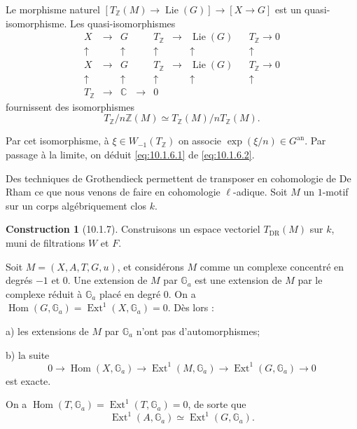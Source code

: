 \documentclass[12pt,a4paper]{amsart}
\theoremstyle{plain}
\theoremstyle{definition}
\newtheorem{construction}[lemme]{Construction}
\theoremstyle{remark}
\DeclareMathOperator{\Hom}{Hom}
\DeclareMathOperator{\Ext}{Ext}
\DeclareMathOperator{\Lie}{Lie}
\numberwithin{equation}{section}
\begin{document}
Le morphisme naturel $[T_\mathbb{Z}(M)\to\Lie(G)]\to[X\to G]$ est un quasi-isomorphisme. Les quasi-isomorphismes
\[
\begin{array}{ccccccccc}
X & \longrightarrow & G & & T_\mathbb{Z} & \longrightarrow & \Lie(G) & & T_\mathbb{Z} \longrightarrow 0 \\
\uparrow & & \uparrow & & \uparrow & & \uparrow & & \uparrow \\
X & \longrightarrow & G & & T_\mathbb{Z} & \longrightarrow & \Lie(G) & & T_\mathbb{Z} \longrightarrow 0 \\
\uparrow & & \uparrow & & \uparrow & & \uparrow & & \uparrow \\
T_\mathbb{Z} & \longrightarrow & \mathbb{C} & \longrightarrow & 0 & & & &
\end{array}
\]
fournissent des isomorphismes
\begin{equation}\label{eq:10.1.6.2}
T_\mathbb{Z}/n\mathbb{Z}(M) \simeq T_\mathbb{Z}(M)/nT_\mathbb{Z}(M).
\end{equation}

Par cet isomorphisme, à $\xi\in W_{-1}(T_\mathbb{Z})$ on associe $\exp(\xi/n)\in G^\mathrm{an}$. Par passage à la limite, on déduit \eqref{eq:10.1.6.1} de \eqref{eq:10.1.6.2}.

Des techniques de Grothendieck permettent de transposer en cohomologie de De Rham ce que nous venons de faire en cohomologie $\ell$-adique. Soit $M$ un $1$-motif sur un corps algébriquement clos $k$.

\begin{construction}[10.1.7]\label{cons:10.1.7}
Construisons un espace vectoriel $T_\mathrm{DR}(M)$ sur $k$, muni de filtrations $W$ et $F$.
\end{construction}

Soit $M=(X,A,T,G,u)$, et considérons $M$ comme un complexe concentré en degrés $-1$ et $0$. Une extension de $M$ par $\mathbb{G}_a$ est une extension de $M$ par le complexe réduit à $\mathbb{G}_a$ placé en degré $0$. On a $\Hom(G,\mathbb{G}_a)=\Ext^1(X,\mathbb{G}_a)=0$. Dès lors :

a) les extensions de $M$ par $\mathbb{G}_a$ n'ont pas d'automorphismes;

b) la suite
\[
0 \longrightarrow \Hom(X,\mathbb{G}_a) \longrightarrow \Ext^1(M,\mathbb{G}_a) \longrightarrow \Ext^1(G,\mathbb{G}_a) \longrightarrow 0
\]
est exacte.

On a $\Hom(T,\mathbb{G}_a)=\Ext^1(T,\mathbb{G}_a)=0$, de sorte que
\[
\Ext^1(A,\mathbb{G}_a) \simeq \Ext^1(G,\mathbb{G}_a).
\]
\end{document}
